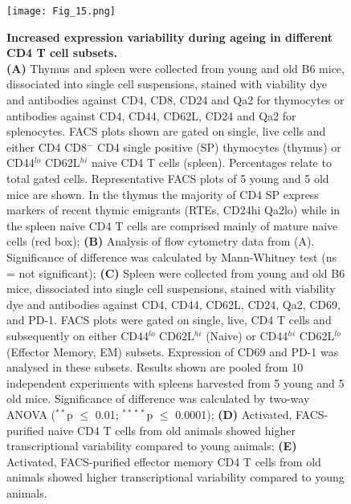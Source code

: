 \begin{figure}[!ht]
\centering
\texttt{[image: Fig\_15.png]}
\caption[Increased expression variability during ageing in different CD4\plus{} T cell subsets]{\textbf{Increased expression variability during ageing in different CD4\plus{} T cell subsets.} \\
\textbf{(A)} Thymus and spleen were collected from young and old B6 mice, dissociated into single cell suspensions, stained with viability dye and antibodies against CD4, CD8, CD24 and Qa2 for thymocytes or antibodies against CD4, CD44, CD62L, CD24 and Qa2 for splenocytes. FACS plots shown are gated on single, live cells and either CD4\plus{} CD8$^-$ CD4 single positive (SP) thymocytes (thymus) or CD44$^{lo}$ CD62L$^{hi}$ naive CD4\plus{} T cells (spleen). Percentages relate to total gated cells. Representative FACS plots of 5 young and 5 old mice are shown. In the thymus the majority of CD4 SP express markers of recent thymic emigrants (RTEs, CD24hi Qa2lo) while in the spleen naive CD4\plus{} T cells are comprised mainly of mature naive cells (red box); \textbf{(B)} Analysis of flow cytometry data from (A). Significance of difference was calculated by Mann-Whitney test (ns = not significant); \textbf{(C)} Spleen were collected from young and old B6 mice, dissociated into single cell suspensions, stained with viability dye and antibodies against CD4, CD44, CD62L, CD24, Qa2, CD69, and PD-1. FACS plots were gated on single, live, CD4\plus{} T cells and subsequently on either CD44$^{lo}$ CD62L$^{hi}$ (Naive) or CD44$^{hi}$ CD62L$^{lo}$ (Effector Memory, EM) subsets. Expression of CD69 and PD-1 was analysed in these subsets. Results shown are pooled from 10 independent experiments with spleens harvested from 5 young and 5 old mice. Significance of difference was calculated by two-way ANOVA ($^{\ast{}\ast}$p $\leq$ 0.01; $^{\ast{}\ast{}\ast{}\ast}$p $\leq$ 0.0001); \textbf{(D)} Activated, FACS-purified naive CD4\plus{} T cells from old animals showed higher transcriptional variability compared to young animals; \textbf{(E)} Activated, FACS-purified effector memory CD4\plus{} T cells from old animals showed higher transcriptional variability compared to young animals.}
\label{fig1:EM_Naive_CD4}
\end{figure}

